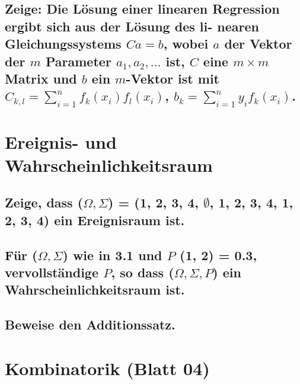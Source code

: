 \documentclass[a4paper,10pt]{article}
\begin{document}
\subsection{Zeige: Die Lösung einer linearen Regression ergibt sich aus der Lösung des li-
nearen Gleichungssystems $C a = b$, wobei $a$ der Vektor der $m$ Parameter $a_1 , a_2 , . . .$
ist, $C$ eine $m × m$ Matrix und $b$ ein $m$-Vektor ist mit\newline
$C_{k,l}=\sum\limits_{i=1}^n f_k (x_i)f_l (x_i)$, $b_k = \sum\limits_{i=1}^n y_i f_k (x_i)$.}

\newpage
\section{Ereignis- und Wahrscheinlichkeitsraum}
\subsection{Zeige, dass ($\Omega, \Sigma$) = ({1, 2, 3, 4}, {$\emptyset$, {1, 2}, {3, 4}, {1, 2, 3, 4}}) ein Ereignisraum ist.}

\subsection{Für ($\Omega, \Sigma$) wie in 3.1 und $P$ ({1, 2}) = 0.3, vervollständige $P$, so dass ($\Omega, \Sigma, P$) ein Wahrscheinlichkeitsraum ist.}

\subsection{Beweise den Additionssatz.}

\newpage
\section{Kombinatorik (Blatt 04)} %
\subsection{}%

\subsection{}
\end{document}
